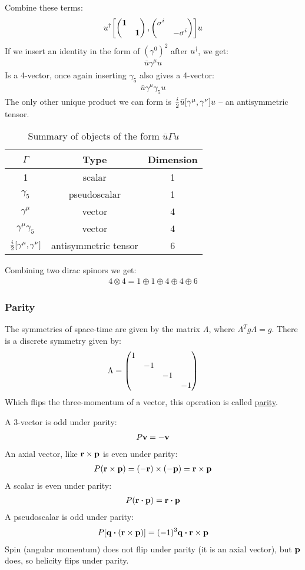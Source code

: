 Combine these terms:
\begin{align*}
  u^\dag\qty[\pmqty{\dmat{\bm{1},\bm{1}}},\pmqty{\dmat{\sigma^i,-\sigma^i}}]u
\end{align*}
If we insert an identity in the form of $(\gamma^0)^2$ after $u^\dag$, we get:
\begin{align*}
  \bar{u}\gamma^\mu u
\end{align*}
Is a 4-vector, once again inserting $\gamma_5$ also gives a 4-vector:
\begin{align*}
  \bar{u}\gamma^\mu\gamma_5u
\end{align*}
The only other unique product we can form is $\frac{i}2\bar{u}\comm{\gamma^\mu}{\gamma^\nu}u$ -- an antisymmetric tensor.
\begin{table}[H]
  \centering
  \begin{tabular}{ccc}
    $\Gamma$ & Type & Dimension \\\hline
    1 & scalar & 1 \\
    $\gamma_5$ & pseudoscalar & 1 \\
    $\gamma^\mu$ & vector & 4 \\
    $\gamma^\mu\gamma_5$ & vector & 4 \\
    $\frac{i}2\comm{\gamma^\mu}{\gamma^\nu}$ & antisymmetric tensor & 6
  \end{tabular}
  \caption{Summary of objects of the form $\bar{u}\Gamma u$}
  \label{tab:bilinears}
\end{table}
Combining two dirac spinors we get:
\begin{align*}
  4\otimes4=1\oplus1\oplus4\oplus4\oplus6
\end{align*}

\subsubsection{Parity}
The symmetries of space-time are given by the matrix $\Lambda$, where $\Lambda^Tg\Lambda=g$. There is a discrete symmetry given by:
\begin{align*}
  \Lambda=\pmqty{\dmat{1,-1,-1,-1}}
\end{align*}
Which flips the three-momentum of a vector, this operation is called \underline{parity}.

A 3-vector is odd under parity:
\begin{align*}
  P\vb{v}=-\vb{v}
\end{align*}
An axial vector, like $\vb{r\times p}$ is even under parity:
\begin{align*}
  P(\vb{r\times p})=(-\vb{r})\times(-\vb{p})=\vb{r\times p}
\end{align*}
A scalar is even under parity:
\begin{align*}
  P(\vb{r\vdot p})=\vb{r\vdot p}
\end{align*}
A pseudoscalar is odd under parity:
\begin{align*}
  P[\vb{q}\vdot(\vb{r\times p})]=(-1)^3\vb{q}\vdot\vb{r\times p}
\end{align*}
Spin (angular momentum) does not flip under parity (it is an axial vector), but $\vb{p}$ does, so helicity flips under parity.

